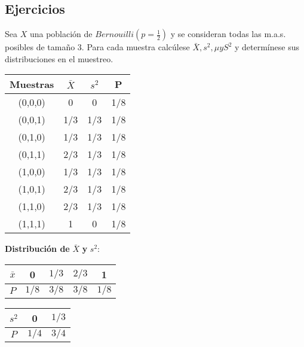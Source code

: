 \subsection{Ejercicios}
\begin{problem}{2.1}
	Sea $X$ una población de $Bernouilli(p = \frac{1}{2})$ y se consideran todas las m.a.s. posibles de tamaño 3. Para cada muestra calcúlese $\bar{X}, s^2, \mu y S^2$ y determínese sus distribuciones en el muestreo. 
\end{problem}
\begin{sol}
	\begin{center}
		\begin{tabular}{c c c c}
			\toprule
			\textbf{Muestras} & $\bar{X}$ & $s^2$ & P \\
			\midrule
			(0,0,0)   & 0     & 0     & 1/8 \\
			(0,0,1)   & 1/3   & 1/3   & 1/8 \\
			(0,1,0)   & 1/3   & 1/3   & 1/8 \\
			(0,1,1)   & 2/3   & 1/3   & 1/8 \\
			(1,0,0)   & 1/3   & 1/3   & 1/8 \\
			(1,0,1)   & 2/3   & 1/3   & 1/8 \\
			(1,1,0)   & 2/3   & 1/3   & 1/8 \\
			(1,1,1)   & 1     & 0     & 1/8 \\
			\bottomrule
		\end{tabular}
	\end{center}
	
	\vspace{0.1cm} %
	
	\textbf{Distribución de} $\bar{X}$ \textbf{y} $s^2$:
	
	\vspace{0cm} %
	
	\begin{center}
		\begin{tabular}{c|cccc} 
			$\bar{x}$ & 0 & $1/3$ & $2/3$ & 1 \\
			\hline
			$P$ & $1/8$ & $3/8$ & $3/8$ & $1/8$ \\
		\end{tabular}
		\hspace{1cm} %
		\begin{tabular}{c|cc} 
			$s^2$ & 0 & $1/3$  \\
			\hline
			$P$ & $1/4$ & $3/4$ \\
		\end{tabular}
	\end{center}
\end{sol}

